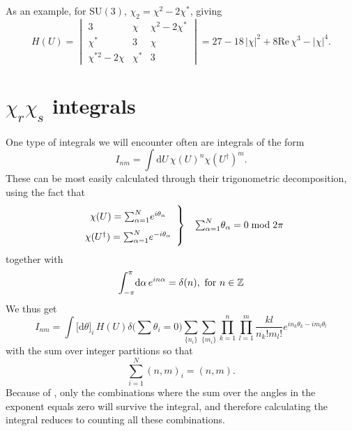 As an example, for SU$(3)$, $\chi_2 = \chi^2 - 2 \chi^*$, giving
%
\begin{equation} \label{eq-su3-haar-measure}
  H(U) =
  \begin{vmatrix}
    3 & \chi & \chi^2 - 2 \chi^* \\
    \chi^* & 3 & \chi \\
    \chi^{*2} - 2 \chi & \chi^* & 3
  \end{vmatrix} = 27 - 18\, |\chi|^2  + 8 \mathrm{Re}\, \chi^3 - |\chi|^4.
\end{equation}

\section{\texorpdfstring{$\chi_r \chi_s$}{Ln Lm} integrals} \label{sec-character_integrals}

One type of integrals we will encounter often are integrals of the form
%
\begin{equation}
  I_{nm} = \int \mathrm{d} U \, \chi(U)^n \chi(U^{\dagger})^m.
\end{equation}
%
These can be most easily calculated through their trigonometric decomposition,
using the fact that
%
\begin{equation}
  \left. \renewcommand{\arraystretch}{1.75}
  \begin{array}{c}
    \chi(U) = {\textstyle\sum_{\alpha=1}^N} e^{i \theta_\alpha} \\
    \chi(U^{\dagger}) = {\textstyle\sum_{\alpha=1}^N} e^{- i \theta_\alpha}
  \end{array}\right\}\kern-\nulldelimiterspace
  \hskip1em {\textstyle\sum_{\alpha=1}^N} \theta_{\alpha} = 0 \bmod 2\pi
\end{equation}
%
together with
%
\begin{equation} \label{eq-oscillating-integral}
  \int_{\mathrlap{-\pi}}^{\pi} \mathrm{d}\alpha \, e^{in \alpha} = \delta(n),
  \text{ for } n \in \mathbb{Z}
\end{equation}
%
We thus get
%
\begin{equation}
  I_{nm} = \int \big[ \mathrm{d} \theta \big]_i\, H(U)
  \delta\big({\textstyle\sum}\theta_i = 0\big)
  \sum_{\{n_i\}} \sum_{\{m_i\}} \prod_{k=1}^n
  \prod_{l=1}^m \frac{k l}{n_k! m_l!} e^{i n_k \theta_k - i m_l \theta_l}
\end{equation}
%
with the sum over integer partitions so that
%
\begin{equation}
  \sum_{i=1}^N (n,m)_i = (n,m).
\end{equation}
%
Because of , only the combinations where the sum
over the angles in the exponent equals zero will survive the integral, and
therefore calculating the integral reduces to counting all these combinations.

